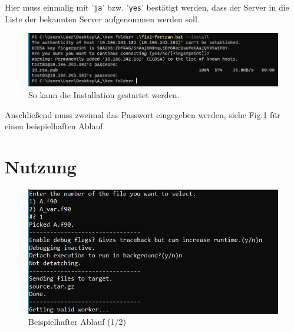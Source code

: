 \documentclass[11pt, a4paper]{article}
\begin{document}
Hier muss einmalig mit '\texttt{ja}' bzw. '\texttt{yes}' bestätigt werden, dass der Server in die Liste der bekannten Server aufgenommen werden soll.

\begin{figure}[h]
    \centering
    \includegraphics[width=1\linewidth]{./pics/2022-03-08_23-57.png}
    \caption{So kann die Installation gestartet werden.}
    \label{fig:install-2}
\end{figure}

Anschließend muss zweimal das Passwort eingegeben werden, siehe Fig.\ref{fig:install-2} für einen beispielhaften Ablauf.





\clearpage


\section{Nutzung}

\begin{figure}[htb!]
    \centering
    \includegraphics[width=0.7\linewidth]{./pics/2022-03-08_23-59_1.png}
    \caption{Beispielhafter Ablauf (1/2)}
    \label{fig:usage}
\end{figure}
\end{document}
